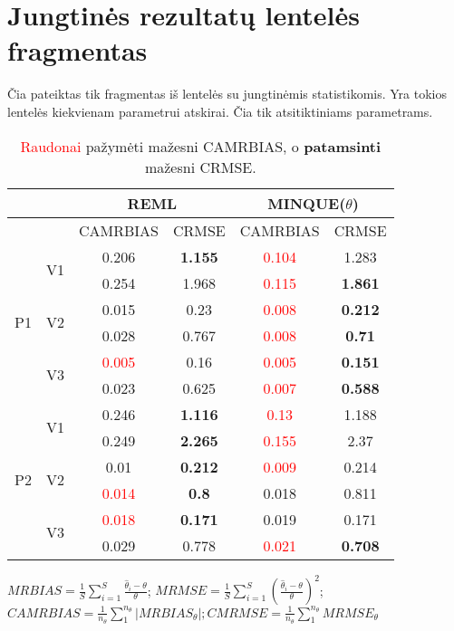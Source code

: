 \documentclass[12pt,a4paper]{article}
\begin{document}
\section{Jungtinės rezultatų lentelės fragmentas}
Čia pateiktas tik fragmentas iš lentelės su jungtinėmis statistikomis. Yra tokios lentelės kiekvienam parametrui atskirai. Čia tik atsitiktiniams parametrams.
\begin{table}
\centering
{\scriptsize 
\begin{tabular}{cc|cc|cc|}
   & & \multicolumn{2}{c|}{REML}&\multicolumn{2}{c|}{MINQUE($\theta$)}\\ \hline
 &  & CAMRBIAS & CRMSE & CAMRBIAS & CRMSE \\ 
  \hline
\multirow{6}{*}{P1} & \multirow{2}{*}{V1} & 0.206 & \textbf{1.155} &  \textcolor{red}{0.104} & 1.283 \\ 
   &  & 0.254 & 1.968 & \textcolor{red}{0.115} & \textbf{1.861} \\ 
   & \multirow{2}{*}{V2} & 0.015 & 0.23 & \textcolor{red}{0.008} & \textbf{0.212} \\ 
   &  & 0.028 & 0.767  & \textcolor{red}{0.008} & \textbf{0.71} \\ 
   & \multirow{2}{*}{V3} & \textcolor{red}{0.005} & 0.16  & \textcolor{red}{0.005} & \textbf{0.151} \\ 
   &  & 0.023 & 0.625 & \textcolor{red}{0.007} & \textbf{0.588} \\ 
   \hline \hline
\multirow{6}{*}{P2} & \multirow{2}{*}{V1} & 0.246 & \textbf{1.116}  & \textcolor{red}{0.13} & 1.188 \\ 
   &  & 0.249 & \textbf{2.265} & \textcolor{red}{0.155} & 2.37 \\ 
   & \multirow{2}{*}{V2} & 0.01 & \textbf{0.212} & \textcolor{red}{0.009} & 0.214 \\ 
   &  & \textcolor{red}{0.014} & \textbf{0.8} & 0.018 & 0.811 \\ 
   & \multirow{2}{*}{V3} & \textcolor{red}{0.018} & \textbf{0.171} & 0.019 & 0.171 \\ 
   &  & 0.029 & 0.778 & \textcolor{red}{0.021} & \textbf{0.708} \\ 
\hline
\end{tabular}
}
\caption{ \textcolor{red}{Raudonai} pažymėti mažesni CAMRBIAS, o \textbf{patamsinti} mažesni CRMSE. }
\end{table}

\centering
{
$MRBIAS=\frac{1}{S}\sum_{i=1}^S\frac{\hat{\theta}_i-\theta}{\theta}$;
$MRMSE=\frac{1}{S}\sum_{i=1}^S\left(\frac{\hat{\theta}_{i}-\theta}{\theta}\right)^2$;\\
$CAMRBIAS=\frac{1}{n_{\theta}}\sum_1^{n_{\theta}}|MRBIAS_{\theta}|;CMRMSE=\frac{1}{n_{\theta}}\sum_1^{n_{\theta}}MRMSE_{\theta }$

}
\end{document}
